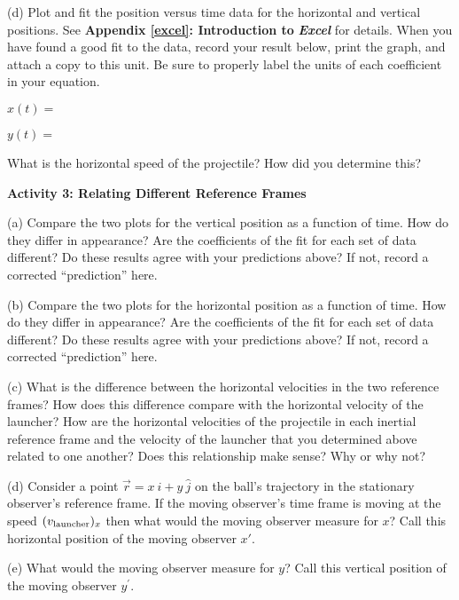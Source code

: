 \pagebreak[2]
(d) Plot and fit the position versus time data for the horizontal
and vertical positions. See \textbf{Appendix \ref{excel}: Introduction to} \textbf{\emph{Excel}}
for details. When you have found a good fit to the data, record your
result below, print the graph, and attach a copy to this unit. Be
sure to properly label the units of each coefficient in your equation.

$x(t) =$
\vspace{5mm}

$y(t) =$
\vspace{5mm}

What is the horizontal speed of the projectile? How did you determine
this?
\vspace{60mm}

\textbf{Activity 3: Relating Different Reference Frames}

(a) Compare the two plots for the vertical position as a function
of time. How do they differ in appearance? Are the coefficients of
the fit for each set of data different? Do these results agree with
your predictions above? If not, record a corrected {}``prediction''
here.
\vspace{20mm}

(b) Compare the two plots for the horizontal position as a function
of time. How do they differ in appearance? Are the coefficients of
the fit for each set of data different? Do these results agree with
your predictions above? If not, record a corrected {}``prediction''
here.
\vspace{17mm}

(c) What is the difference between the horizontal velocities in the
two reference frames? How does this difference compare with the horizontal
velocity of the launcher? How are the horizontal velocities of the
projectile in each inertial reference frame and the velocity of the
launcher that you determined above related to one another? Does this
relationship make sense? Why or why not?
\vspace{15mm}

(d) Consider a point ${\vec r} = x~{\widehat i} + y~{\widehat j}$ on the
ball's trajectory in the stationary observer's reference frame. If
the moving observer's time frame is moving at the speed \( (v_{ \rm launcher})_{x} \)
then what would the moving observer measure for $x$? Call this horizontal
position of the moving observer $x'$.
\vspace{15mm}

(e) What would the moving observer measure for $y$? Call this vertical
position of the moving observer \(y^\prime\).
\vspace{15mm}

